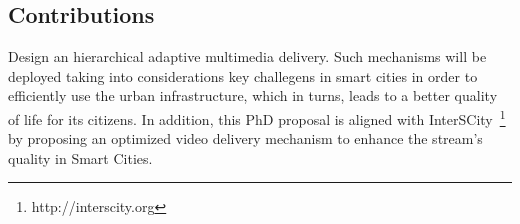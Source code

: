\subsection*{Contributions}
\label{sec:contributions}




Design an hierarchical adaptive multimedia delivery. Such mechanisms will be deployed taking into considerations key challegens in smart cities in order to efficiently use the urban infrastructure, which in turns, leads to a better quality of life for its citizens.
In addition, this PhD proposal is aligned with InterSCity~\footnote{http://interscity.org} by proposing an optimized video delivery mechanism to enhance the stream's quality in Smart Cities.


%
%


